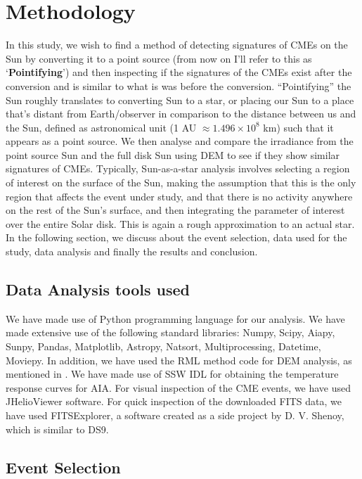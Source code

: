 \section{Methodology}

In this study, we wish to find a method of detecting signatures of CMEs on the Sun by converting it to a point source (from now on I'll refer to this as `\textbf{Pointifying}') and then inspecting if the signatures of the CMEs exist after the conversion and is similar to what is was before the conversion. ``Pointifying'' the Sun roughly translates to converting Sun to a star, or placing our Sun to a place that's distant from Earth/observer in comparison to the distance between us and the Sun, defined as astronomical unit (1 AU $\approx 1.496\times10^{8}$ km) such that it appears as a point source. We then analyse and compare the irradiance from the point source Sun and the full disk Sun using DEM to see if they show similar signatures of CMEs. Typically, Sun-as-a-star analysis involves selecting a region of interest on the surface of the Sun, making the assumption that this is the only region that affects the event under study, and that there is no activity anywhere on the rest of the Sun's surface, and then integrating the parameter of interest over the entire Solar disk. This is again a rough approximation to  an actual star.\\

\noindent In the following section, we discuss about the event selection, data used for the study, data analysis and finally the results and conclusion.

\subsection{Data Analysis tools used}

We have made use of Python programming language for our analysis. We have made extensive use of the following standard libraries: Numpy, Scipy, Aiapy, Sunpy, Pandas, Matplotlib, Astropy, Natsort, Multiprocessing, Datetime, Moviepy. In addition, we have used the RML method code for DEM analysis, as mentioned in \citep{Massa2023}. We have made use of SSW IDL for obtaining the temperature response curves for AIA. For visual inspection of the CME events, we have used JHelioViewer software. For quick inspection of the downloaded FITS data, we have used FITSExplorer, a software created as a side project by D. V. Shenoy, which is similar to DS9.

\subsection{Event Selection}

